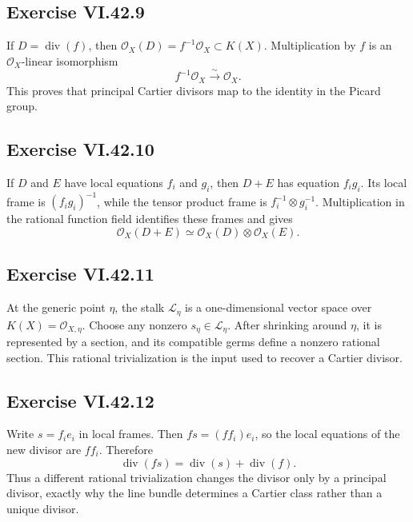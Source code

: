 \subsection*{Exercise VI.42.9}
\begin{solution}
If \(D=\operatorname{div}(f)\), then \(\mathcal O_X(D)=f^{-1}\mathcal O_X\subset K(X)\).  Multiplication by \(f\) is an \(\mathcal O_X\)-linear isomorphism
\[
f^{-1}\mathcal O_X\xrightarrow{\sim}\mathcal O_X.
\]
This proves that principal Cartier divisors map to the identity in the Picard group.
\end{solution}

\subsection*{Exercise VI.42.10}
\begin{solution}
If \(D\) and \(E\) have local equations \(f_i\) and \(g_i\), then \(D+E\) has equation \(f_ig_i\).  Its local frame is \((f_ig_i)^{-1}\), while the tensor product frame is \(f_i^{-1}\otimes g_i^{-1}\).  Multiplication in the rational function field identifies these frames and gives
\[
\mathcal O_X(D+E)\simeq\mathcal O_X(D)\otimes\mathcal O_X(E).
\]
\end{solution}

\subsection*{Exercise VI.42.11}
\begin{solution}
At the generic point \(\eta\), the stalk \(\mathcal L_\eta\) is a one-dimensional vector space over \(K(X)=\mathcal O_{X,\eta}\).  Choose any nonzero \(s_\eta\in\mathcal L_\eta\).  After shrinking around \(\eta\), it is represented by a section, and its compatible germs define a nonzero rational section.  This rational trivialization is the input used to recover a Cartier divisor.
\end{solution}

\subsection*{Exercise VI.42.12}
\begin{solution}
Write \(s=f_i e_i\) in local frames.  Then \(fs=(ff_i)e_i\), so the local equations of the new divisor are \(ff_i\).  Therefore
\[
\operatorname{div}(fs)=\operatorname{div}(s)+\operatorname{div}(f).
\]
Thus a different rational trivialization changes the divisor only by a principal divisor, exactly why the line bundle determines a Cartier class rather than a unique divisor.
\end{solution}

